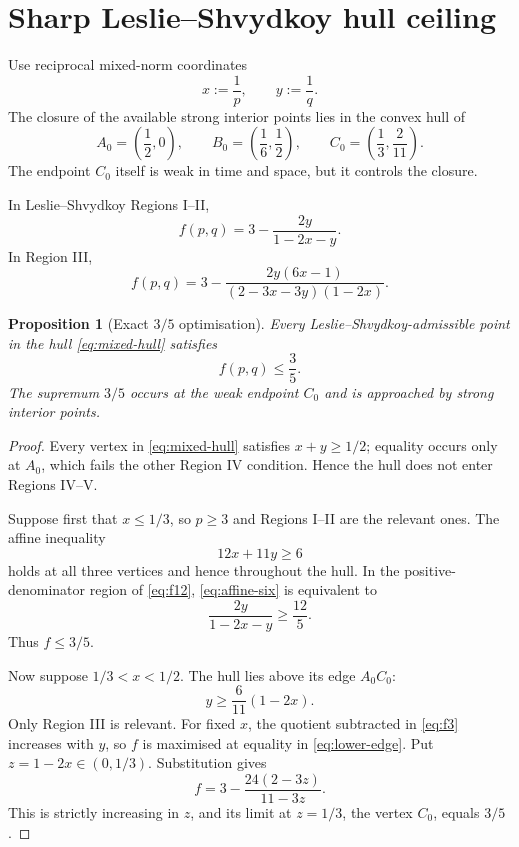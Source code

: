 \documentclass[11pt]{article}
\newtheorem{proposition}[theorem]{Proposition}
\theoremstyle{remark}
\begin{document}
\section{Sharp Leslie--Shvydkoy hull ceiling}

Use reciprocal mixed-norm coordinates
\[
 x:=\frac1p,\qquad y:=\frac1q.
\]
The closure of the available strong interior points lies in the convex
hull of
\begin{equation}
 \label{eq:mixed-hull}
 A_0=\left(\frac12,0\right),
 \qquad
 B_0=\left(\frac16,\frac12\right),
 \qquad
 C_0=\left(\frac13,\frac2{11}\right).
\end{equation}
The endpoint \(C_0\) itself is weak in time and space, but it controls
the closure.

In Leslie--Shvydkoy Regions I--II,
\begin{equation}
 \label{eq:f12}
 f(p,q)
 =
 3-\frac{2y}{1-2x-y}.
\end{equation}
In Region III,
\begin{equation}
 \label{eq:f3}
 f(p,q)
 =
 3-
 \frac{2y(6x-1)}
 {(2-3x-3y)(1-2x)}.
\end{equation}

\begin{proposition}[Exact \(3/5\) optimisation]
\label{prop:three-fifths}
Every Leslie--Shvydkoy-admissible point in the hull
\eqref{eq:mixed-hull} satisfies
\[
 f(p,q)\leq\frac35.
\]
The supremum \(3/5\) occurs at the weak endpoint \(C_0\) and is
approached by strong interior points.
\end{proposition}

\begin{proof}
Every vertex in \eqref{eq:mixed-hull} satisfies \(x+y\geq1/2\);
equality occurs only at \(A_0\), which fails the other Region IV
condition.  Hence the hull does not enter Regions IV--V.

Suppose first that \(x\leq1/3\), so \(p\geq3\) and Regions I--II are
the relevant ones.  The affine inequality
\begin{equation}
 \label{eq:affine-six}
 12x+11y\geq6
\end{equation}
holds at all three vertices and hence throughout the hull.  In the
positive-denominator region of \eqref{eq:f12},
\eqref{eq:affine-six} is equivalent to
\[
 \frac{2y}{1-2x-y}\geq\frac{12}{5}.
\]
Thus \(f\leq3/5\).

Now suppose \(1/3<x<1/2\).  The hull lies above its edge
\(A_0C_0\):
\begin{equation}
 \label{eq:lower-edge}
 y\geq\frac6{11}(1-2x).
\end{equation}
Only Region III is relevant.  For fixed \(x\), the quotient subtracted
in \eqref{eq:f3} increases with \(y\), so \(f\) is maximised at equality
in \eqref{eq:lower-edge}.  Put \(z=1-2x\in(0,1/3)\).  Substitution gives
\[
 f
 =
 3-\frac{24(2-3z)}{11-3z}.
\]
This is strictly increasing in \(z\), and its limit at \(z=1/3\),
the vertex \(C_0\), equals \(3/5\).
\end{proof}
\end{document}
